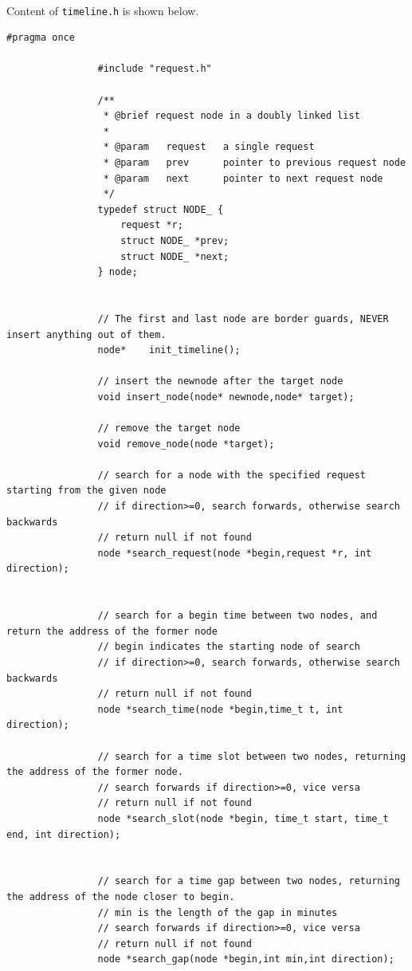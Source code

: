 \documentclass{article}
\begin{document}
            \paragraph{}
                Content of \texttt{timeline.h} is shown below.
            \begin{Verbatim}[gobble=8]
                #pragma once

                #include "request.h"
                
                /**
                 * @brief request node in a doubly linked list
                 * 
                 * @param   request   a single request
                 * @param   prev      pointer to previous request node
                 * @param   next      pointer to next request node
                 */
                typedef struct NODE_ {
                    request *r;
                    struct NODE_ *prev;
                    struct NODE_ *next;
                } node;
                
                
                // The first and last node are border guards, NEVER insert anything out of them.
                node*    init_timeline();
                
                // insert the newnode after the target node
                void insert_node(node* newnode,node* target);
                
                // remove the target node
                void remove_node(node *target);
                
                // search for a node with the specified request starting from the given node
                // if direction>=0, search forwards, otherwise search backwards
                // return null if not found
                node *search_request(node *begin,request *r, int direction);
                
                
                // search for a begin time between two nodes, and return the address of the former node
                // begin indicates the starting node of search
                // if direction>=0, search forwards, otherwise search backwards
                // return null if not found
                node *search_time(node *begin,time_t t, int direction);
                
                // search for a time slot between two nodes, returning the address of the former node.
                // search forwards if direction>=0, vice versa
                // return null if not found
                node *search_slot(node *begin, time_t start, time_t end, int direction);
                
                
                // search for a time gap between two nodes, returning the address of the node closer to begin.
                // min is the length of the gap in minutes
                // search forwards if direction>=0, vice versa
                // return null if not found
                node *search_gap(node *begin,int min,int direction);
            \end{Verbatim}
\end{document}
